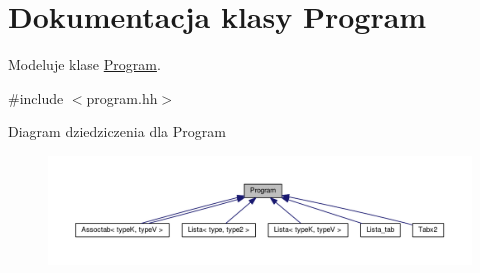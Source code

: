 \hypertarget{class_program}{\section{Dokumentacja klasy Program}
\label{class_program}
}


Modeluje klase \hyperlink{class_program}{Program}.  




{\ttfamily \#include $<$program.\-hh$>$}



Diagram dziedziczenia dla Program\nopagebreak
\begin{figure}[H]
\begin{center}
\leavevmode
\includegraphics[width=350pt]{class_program__inherit__graph}
\end{center}
\end{figure}
